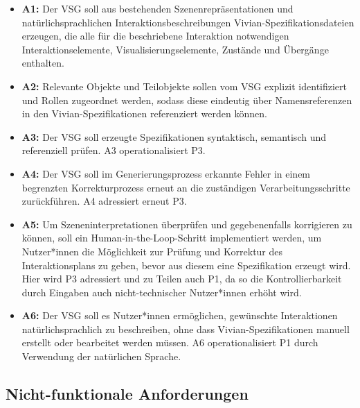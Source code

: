 \begin{itemize}
    \item \textbf{A1:} Der VSG soll aus bestehenden Szenenrepräsentationen und natürlichsprachlichen Interaktionsbeschreibungen Vivian-Spezifikationsdateien erzeugen, die alle für die beschriebene Interaktion notwendigen Interaktionselemente, Visualisierungselemente, Zustände und Übergänge enthalten.
    \item \textbf{A2:} Relevante Objekte und Teilobjekte sollen vom VSG explizit identifiziert und Rollen zugeordnet werden, sodass diese eindeutig über Namensreferenzen in den Vivian-Spezifikationen referenziert werden können.
    \item \textbf{A3:} Der VSG soll erzeugte Spezifikationen syntaktisch, semantisch und referenziell prüfen. A3 operationalisiert P3.
    \item \textbf{A4:} Der VSG soll im Generierungsprozess erkannte Fehler in einem begrenzten Korrekturprozess erneut an die zuständigen Verarbeitungsschritte zurückführen. A4 adressiert erneut P3.
    \item \textbf{A5:} Um Szeneninterpretationen überprüfen und gegebenenfalls korrigieren zu können, soll ein Human-in-the-Loop-Schritt implementiert werden, um Nutzer*innen die Möglichkeit zur Prüfung und Korrektur des Interaktionsplans zu geben, bevor aus diesem eine Spezifikation erzeugt wird. Hier wird P3 adressiert und zu Teilen auch P1, da so die Kontrollierbarkeit durch Eingaben auch nicht-technischer Nutzer*innen erhöht wird.
    \item \textbf{A6:} Der VSG soll es Nutzer*innen ermöglichen, gewünschte Interaktionen natürlichsprachlich zu beschreiben, ohne dass Vivian-Spezifikationen manuell erstellt oder bearbeitet werden müssen. A6 operationalisiert P1 durch Verwendung der natürlichen Sprache.
\end{itemize}

\subsection*{Nicht-funktionale Anforderungen}

